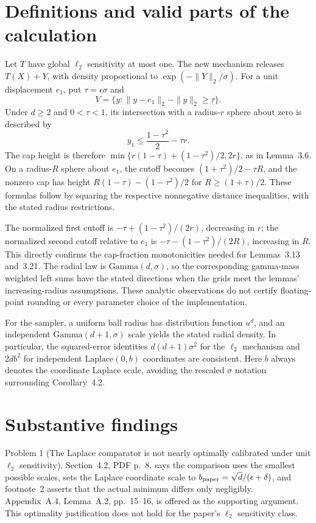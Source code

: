 \documentclass[10pt]{article}
\begin{document}
\section*{Definitions and valid parts of the calculation}
Let \(T\) have global \(\ell_2\) sensitivity at most one. The new mechanism releases \(T(X)+Y\), with density proportional to \(\exp(-\|Y\|_2/\sigma)\). For a unit displacement \(e_1\), put \(\tau=\epsilon\sigma\) and \[V=\{y:\|y-e_1\|_2-\|y\|_2\geq\tau\}.\] Under \(d\geq2\) and \(0<\tau<1\), its intersection with a radius-\(r\) sphere about zero is described by \[y_1\leq \frac{1-\tau^2}{2}-\tau r.\] The cap height is therefore \(\min\{r(1-\tau)+(1-\tau^2)/2,2r\}\), as in Lemma 3.6. On a radius-\(R\) sphere about \(e_1\), the cutoff becomes \((1+\tau^2)/2-\tau R\), and the nonzero cap has height \(R(1-\tau)-(1-\tau^2)/2\) for \(R\geq(1+\tau)/2\). These formulas follow by squaring the respective nonnegative distance inequalities, with the stated radius restrictions.\par
The normalized first cutoff is \(-\tau+(1-\tau^2)/(2r)\), decreasing in \(r\); the normalized second cutoff relative to \(e_1\) is \(-\tau-(1-\tau^2)/(2R)\), increasing in \(R\). This directly confirms the cap-fraction monotonicities needed for Lemmas 3.13 and 3.21. The radial law is \(\mathrm{Gamma}(d,\sigma)\), so the corresponding gamma-mass weighted left sums have the stated directions when the grids meet the lemmas’ increasing-radius assumptions. These analytic observations do not certify floating-point rounding or every parameter choice of the implementation.\par
For the sampler, a uniform ball radius has distribution function \(u^d\), and an independent \(\mathrm{Gamma}(d+1,\sigma)\) scale yields the stated radial density. In particular, the squared-error identities \(d(d+1)\sigma^2\) for the \(\ell_2\) mechanism and \(2db^2\) for independent \(\mathrm{Laplace}(0,b)\) coordinates are consistent. Here \(b\) always denotes the coordinate Laplace scale, avoiding the rescaled \(\sigma\) notation surrounding Corollary 4.2.\par
\section*{Substantive findings}
Problem 1 (The Laplace comparator is not nearly optimally calibrated under unit \(\ell_2\) sensitivity).  Section 4.2, PDF p. 8, says the comparison uses the smallest possible scales, sets the Laplace coordinate scale to \(b_{\rm paper}=\sqrt d/(\epsilon+\delta)\), and footnote 2 asserts that the actual minimum differs only negligibly. Appendix A.4, Lemma A.2, pp. 15–16, is offered as the supporting argument. This optimality justification does not hold for the paper’s \(\ell_2\) sensitivity class.\par
\end{document}
